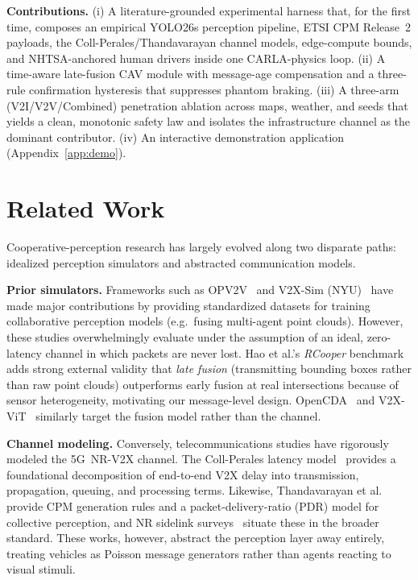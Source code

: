 \documentclass[11pt]{article}
\begin{document}
\noindent\textbf{Contributions.}
(i) A literature-grounded experimental harness that, for the first time, composes
an empirical YOLO26s perception pipeline, ETSI CPM Release~2 payloads, the
Coll-Perales/Thandavarayan channel models, edge-compute bounds, and
NHTSA-anchored human drivers inside one CARLA-physics loop.
(ii) A time-aware late-fusion CAV module with message-age compensation and a
three-rule confirmation hysteresis that suppresses phantom braking.
(iii) A three-arm (V2I/V2V/Combined) penetration ablation across maps, weather,
and seeds that yields a clean, monotonic safety law and isolates the
infrastructure channel as the dominant contributor.
(iv) An interactive demonstration application (Appendix~\ref{app:demo}).

\section{Related Work}
Cooperative-perception research has largely evolved along two disparate paths:
idealized perception simulators and abstracted communication models.

\noindent\textbf{Prior simulators.} Frameworks such as OPV2V~\cite{opv2v2022} and
V2X-Sim (NYU)~\cite{v2xsim2022} have made major contributions by providing
standardized datasets for training collaborative perception models (e.g.\ fusing
multi-agent point clouds). However, these studies overwhelmingly evaluate under
the assumption of an ideal, zero-latency channel in which packets are never lost.
Hao et al.'s \emph{RCooper} benchmark~\cite{rcooper2024} adds strong external
validity that \emph{late fusion} (transmitting bounding boxes rather than raw
point clouds) outperforms early fusion at real intersections because of sensor
heterogeneity, motivating our message-level design. OpenCDA~\cite{opencda2021} and
V2X-ViT~\cite{v2xvit2022} similarly target the fusion model rather than the
channel.

\noindent\textbf{Channel modeling.} Conversely, telecommunications studies have
rigorously modeled the 5G~NR-V2X channel. The Coll-Perales latency
model~\cite{collperales2022} provides a foundational decomposition of end-to-end
V2X delay into transmission, propagation, queuing, and processing terms. Likewise,
Thandavarayan et al.~\cite{thandavarayan2020} provide CPM generation rules and a
packet-delivery-ratio (PDR) model for collective perception, and NR sidelink
surveys~\cite{ahangar2023} situate these in the broader standard. These works,
however, abstract the perception layer away entirely, treating vehicles as Poisson
message generators rather than agents reacting to visual stimuli.
\end{document}
